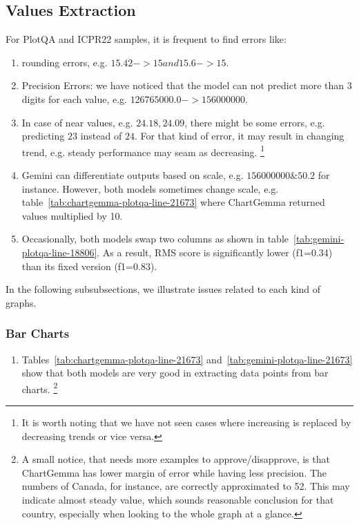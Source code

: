 \documentclass[
	letterpaper, %
]{jdf}
\begin{document}
\subsection{Values Extraction}\label{ssect:values-extraction}
For PlotQA and ICPR22 samples, it is frequent to find errors like:
\begin{enumerate}
     \item rounding errors, e.g. $15.42->15 and 15.6->15$.
     \item Precision Errors: we have noticed that the model can not predict more than 3 digits for each value, e.g. $126765000.0->156000000$.
     \item In case of near values, e.g. $24.18, 24.09$, there might be some errors, e.g. predicting $23$ instead of $24$.
       For that kind of error, it may result in changing trend, e.g. steady performance may seam as decreasing.
       \footnote{It is worth noting that we have not seen cases where increasing is replaced by decreasing trends or vice versa.}
       \item Gemini can differentiate outputs based on scale, e.g. $156000000 \& 50.2$ for instance.
         However, both models sometimes change scale, e.g. table~\ref{tab:chartgemma-plotqa-line-21673} where ChartGemma returned values multiplied by 10.
       \item Occasionally, both models swap two columns as shown in table~\ref{tab:gemini-plotqa-line-18806}.
         As a result, RMS score is significantly lower (f1=0.34) than its fixed version (f1=0.83).
       \end{enumerate}

       In the following subsubsections, we illustrate issues related to each kind of graphs.

\subsubsection{Bar Charts}\label{sssect:bar-errors}
\begin{enumerate}
  \item Tables~\ref{tab:chartgemma-plotqa-line-21673} and~\ref{tab:gemini-plotqa-line-21673} show that both models are very good in extracting data points from bar charts.
    \footnote{A small notice, that needs more examples to approve/disapprove, is that ChartGemma has lower margin of error while having less precision. The numbers of Canada, for instance, are correctly approximated to 52. This may indicate almost steady value, which sounds reasonable conclusion for that country, especially when looking to the whole graph at a glance.}
       \end{enumerate}
\end{document}
